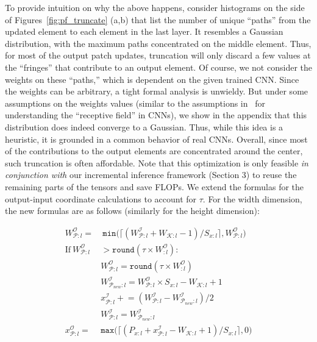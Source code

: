 To provide intuition on why the above happens, consider histograms on the side of Figures~\ref{fig:pf_truncate} (a,b) that list the number of unique ``paths'' from the updated element to each element in the last layer. It resembles a Gaussian distribution, with the maximum paths concentrated on the middle element. Thus, for most of the output patch updates, truncation will only discard a few values at the ``fringes'' that contribute to an output element. Of course, we not consider the weights on these ``paths,'' which is dependent on the given trained CNN. Since the weights can be arbitrary, a tight formal analysis is unwieldy. But under some assumptions on the weights values (similar to the assumptions in~\cite{luo2016understanding} for understanding the ``receptive field'' in CNNs), we show in the appendix that this distribution does indeed converge to a Gaussian. Thus, while this idea is a heuristic, it is grounded in a common behavior of real CNNs.
Overall, since most of the contributions to the output elements are concentrated around the center, such truncation is often affordable. Note that this optimization is only feasible \textit{in conjunction with} our incremental inference framework (Section 3) to reuse the remaining parts of the tensors and save FLOPs.
We extend the formulas for the output-input coordinate calculations to account for $\tau$. For the width dimension,  the new formulas are as follows (similarly for the height dimension):

\vspace{-5mm}
\begin{align}
\label{eqn:normal_width_calc}
W^\mathcal{O}_{\mathcal{P}:l} = &~ \texttt{min}\big(\lceil (W^\mathcal{I}_{\mathcal{P}:l} + W_{\mathcal{K}:l} - 1)/S_{x:l} \rceil, W^\mathcal{O}_{\mathcal{P}:l}\big)\\
\label{eqn:check_tau}
\text{If}~ W_{\mathcal{P}:l}^\mathcal{O} & > \texttt{round}(\tau \times W^\mathcal{O}_{:l}):\\
\label{eqn:new_width_calc_with_tau}
& W^\mathcal{O}_{\mathcal{P}:l} = \texttt{round}(\tau \times W^\mathcal{O}_{:l})\\
\label{eqn:new_in_width}
& W^\mathcal{I}_{\mathcal{P}_{new}:l} = W^\mathcal{O}_{\mathcal{P}:l} \times S_{x:l} - W_{\mathcal{K}:l} + 1\\
\label{eqn:new_x_coord}
& x^{\mathcal{I}}_{\mathcal{P}:l} \mathrel{+}= (W^\mathcal{I}_{\mathcal{P}:l} - W^\mathcal{I}_{\mathcal{P}_{new}:l})/2\\
\label{eqn:new_input_width}
& W^\mathcal{I}_{\mathcal{P}:l} = W^\mathcal{I}_{\mathcal{P}_{new}:l}\\
\label{eqn:new_output_x}
x^\mathcal{O}_{\mathcal{P}:l} = & \texttt{max}\big(\lceil (P_{x:l} + x^\mathcal{I}_{\mathcal{P}:l} - W_{\mathcal{K}:l} + 1)/S_{x:l} \rceil, 0\big)
\end{align}

